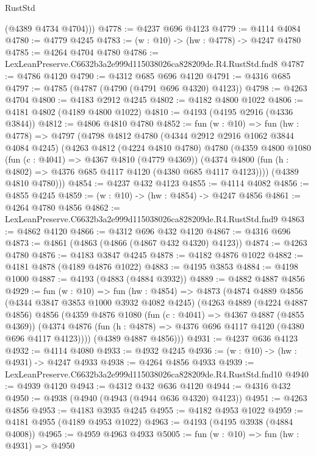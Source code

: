\begin{lexlean}{RustStd}
\begin{coremodule}
        (@4389 @4734 @4704)))
@4778 := @4237 @696 @4123
@4779 := @4114 @4084
@4780 := @4779 @4245
@4783 := (w : @10) -> (hw : @4778) -> @4247 @4780
@4785 := @4264 @4704 @4780
@4786 := LexLeanPreserve.C6632b3a2e999d115038026ca828209de.R4.RustStd.fnd8
@4787 := @4786 @4120
@4790 := @4312 @685 @696 @4120
@4791 := @4316 @685
@4797 := @4785 (@4787 (@4790 (@4791 @696 @4320) @4123))
@4798 := @4263 @4704
@4800 := @4183 @2912 @4245
@4802 := @4182 @4800 @1022
@4806 := @4181 @4802 (@4189 @4800 @1022)
@4810 := @4193 (@4195 @2916 (@4336 @3844))
@4812 := @4806 @4810 @4780
@4852 := fun (w : @10) =>
  fun (hw : @4778) =>
  @4797
    (@4798
      @4812
      @4780
      (@4344 @2912 @2916 @1062 @3844 @4084 @4245)
      (@4263
        @4812
        (@4224 @4810 @4780)
        @4780
        (@4359
          @4800
          @1080
          (fun (c : @4041) => @4367 @4810 (@4779 @4369))
          (@4374 @4800 (fun (h : @4802) => @4376 @685 @4117 @4120 (@4380 @685 @4117 @4123))))
        (@4389 @4810 @4780)))
@4854 := @4237 @432 @4123
@4855 := @4114 @4082
@4856 := @4855 @4245
@4859 := (w : @10) -> (hw : @4854) -> @4247 @4856
@4861 := @4264 @4780 @4856
@4862 := LexLeanPreserve.C6632b3a2e999d115038026ca828209de.R4.RustStd.fnd9
@4863 := @4862 @4120
@4866 := @4312 @696 @432 @4120
@4867 := @4316 @696
@4873 := @4861 (@4863 (@4866 (@4867 @432 @4320) @4123))
@4874 := @4263 @4780
@4876 := @4183 @3847 @4245
@4878 := @4182 @4876 @1022
@4882 := @4181 @4878 (@4189 @4876 @1022)
@4883 := @4195 @3853
@4884 := @4198 @1000
@4887 := @4193 (@4883 (@4884 @3932))
@4889 := @4882 @4887 @4856
@4929 := fun (w : @10) =>
  fun (hw : @4854) =>
  @4873
    (@4874
      @4889
      @4856
      (@4344 @3847 @3853 @1000 @3932 @4082 @4245)
      (@4263
        @4889
        (@4224 @4887 @4856)
        @4856
        (@4359
          @4876
          @1080
          (fun (c : @4041) => @4367 @4887 (@4855 @4369))
          (@4374 @4876 (fun (h : @4878) => @4376 @696 @4117 @4120 (@4380 @696 @4117 @4123))))
        (@4389 @4887 @4856)))
@4931 := @4237 @636 @4123
@4932 := @4114 @4080
@4933 := @4932 @4245
@4936 := (w : @10) -> (hw : @4931) -> @4247 @4933
@4938 := @4264 @4856 @4933
@4939 := LexLeanPreserve.C6632b3a2e999d115038026ca828209de.R4.RustStd.fnd10
@4940 := @4939 @4120
@4943 := @4312 @432 @636 @4120
@4944 := @4316 @432
@4950 := @4938 (@4940 (@4943 (@4944 @636 @4320) @4123))
@4951 := @4263 @4856
@4953 := @4183 @3935 @4245
@4955 := @4182 @4953 @1022
@4959 := @4181 @4955 (@4189 @4953 @1022)
@4963 := @4193 (@4195 @3938 (@4884 @4008))
@4965 := @4959 @4963 @4933
@5005 := fun (w : @10) =>
  fun (hw : @4931) =>
  @4950

\end{coremodule}
\end{lexlean}
